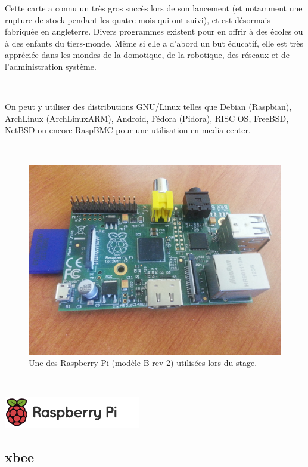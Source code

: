 \documentclass{article}
\begin{document}
Cette carte a connu un très gros succès lors de son lancement (et notamment une rupture de stock pendant les quatre mois qui ont suivi), et est désormais fabriquée en angleterre. Divers programmes existent pour en offrir à des écoles ou à des enfants du tiers-monde. Même si elle a d’abord un but éducatif, elle est très appréciée dans les mondes de la domotique, de la robotique, des réseaux et de l’administration système.

~

On peut y utiliser des distributions GNU/Linux telles que Debian (Raspbian), ArchLinux (ArchLinuxARM), Android, Fédora (Pidora), RISC OS, FreeBSD, NetBSD ou encore RaspBMC pour une utilisation en media center.

~

\begin{figure}[h!]
    \centering\includegraphics[width=\linewidth*2/3]{img/rpi.jpg}
    \caption{Une des Raspberry Pi (modèle B rev 2) utilisées lors du stage.}
\end{figure}

~


\begin{center}
    \includegraphics{img/sprite.png}
\end{center}

\clearpage

\subsection{xbee}
\label{xbee}
\end{document}
